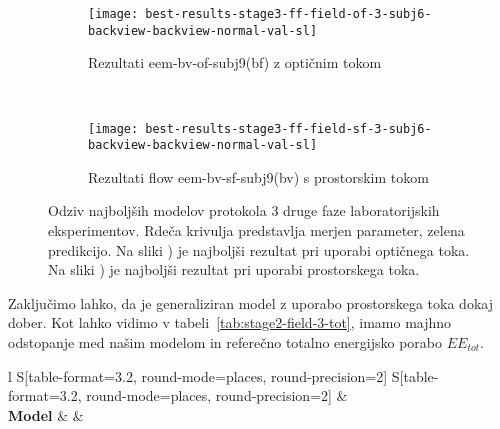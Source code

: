\begin{figure}[!htbp]
	\centering
	\begin{subfigure}[t]{0.45\columnwidth}
		\texttt{[image: best-results-stage3-ff-field-of-3-subj6-backview-backview-normal-val-sl]}
		\caption{Rezultati eem-bv-of-subj9(bf) z optičnim tokom}
		\label{fig:field-of-3}
	\end{subfigure}
	~
	\begin{subfigure}[t]{0.45\columnwidth}
		\texttt{[image: best-results-stage3-ff-field-sf-3-subj6-backview-backview-normal-val-sl]}
		\caption{Rezultati flow eem-bv-sf-subj9(bv) s prostorskim tokom}
		\label{fig:field-sf-3}
	\end{subfigure}
	\caption[Odziv SUBJ9 modelov protokola 3 2. faze lab. eksperimentov]{Odziv najboljših modelov protokola 3 druge faze laboratorijskih eksperimentov. Rdeča krivulja predstavlja merjen parameter, zelena predikcijo. Na sliki ) je najboljši rezultat pri uporabi optičnega toka. Na sliki ) je najboljši rezultat pri uporabi prostorskega toka.}
	\label{fig:field-3}
\end{figure}


Zaključimo lahko, da je generaliziran model z uporabo prostorskega toka dokaj dober. Kot lahko vidimo v tabeli~\ref{tab:stage2-field-3-tot}, imamo majhno odstopanje med našim modelom in referečno totalno energijsko porabo $EE_{tot}$.

\begin{table}[!htbp]
	\centering
	\begin{tabular}{l S[table-format=3.2, round-mode=places, round-precision=2] S[table-format=3.2, round-mode=places, round-precision=2]}
		\toprule
		&  \\
		\textbf{Model} &  &  \\
		\midrule
		\bottomrule
	\end{tabular}
	\caption[Totalna energijska poraba za protokol 3 2. terenske faze]{Totalna energijska poraba za protokol 3 2. terenske faze.}
	\label{tab:stage2-field-3-tot}
\end{table}







